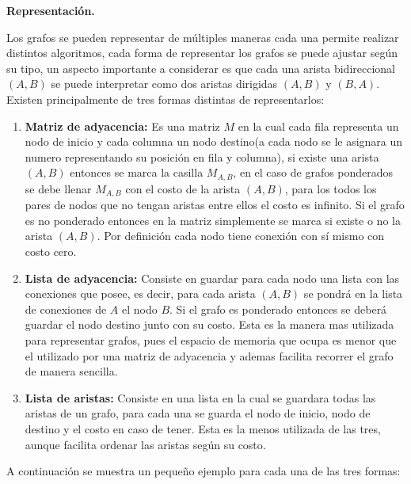 \documentclass[12pt, a4paper]{article}
\newcommand{\subtitulo}[1]{\begin{center}\textbf{#1}\end{center}}
\begin{document}
	\subtitulo{Representación.}
	
	Los grafos se pueden representar de múltiples maneras cada una permite realizar distintos algoritmos, cada forma 
	de representar los grafos se puede ajustar según su tipo, un aspecto importante a considerar es que cada una arista
	bidireccional $(A,B)$ se puede interpretar como dos aristas dirigidas $(A,B)$ y $(B,A)$. Existen principalmente de
	tres formas distintas de representarlos:
	
	\begin{enumerate}[1.]
		\item \textbf{Matriz de adyacencia:} Es una matriz $M$ en la cual cada fila representa un nodo de inicio y cada
			columna un nodo destino(a cada nodo se le asignara un numero representando su posición en fila y columna), 
			si existe una arista $(A,B)$ entonces se marca la casilla $M_{A,B}$, en el caso de grafos ponderados se
			debe llenar $M_{A,B}$ con el costo de la arista $(A,B)$, para los todos los pares de nodos que no tengan
			aristas entre ellos el costo es infinito. Si el grafo es no ponderado entonces en la matriz simplemente se
			marca si existe o no la arista $(A,B)$. Por definición cada nodo tiene conexión con sí mismo con costo cero.
		\item \textbf{Lista de adyacencia:} Consiste en guardar para cada nodo una lista con las conexiones que posee,
		 	es decir, para cada arista $(A,B)$ se pondrá en la lista de conexiones de $A$ el nodo $B$. Si el grafo es
		 	ponderado entonces se deberá guardar el nodo destino junto con su costo. Esta es la manera mas utilizada 
		 	para representar grafos, pues el espacio de memoria que ocupa es menor que el utilizado por una matriz de
		 	adyacencia y ademas facilita recorrer el grafo de manera sencilla.
		\item \textbf{Lista de aristas:} Consiste en una lista en la cual se guardara todas las aristas de un grafo, 
			para cada una se guarda el nodo de inicio, nodo de destino y el costo en caso de tener. Esta es la menos
			 utilizada de las tres, aunque facilita ordenar las aristas según su costo.
	\end{enumerate}
	
	A continuación se muestra un pequeño ejemplo para cada una de las tres formas:
	
\end{document}
